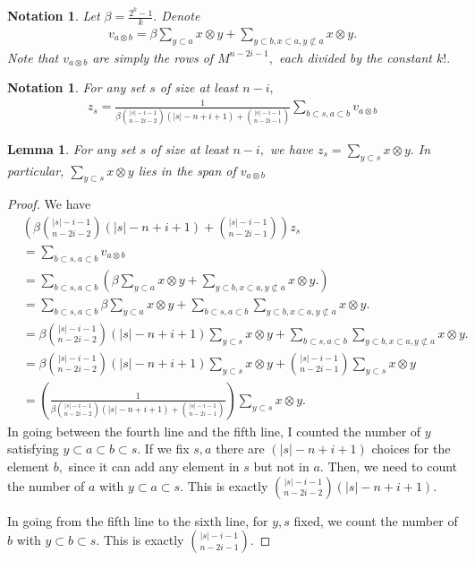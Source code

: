 \documentclass{amsart}
\newtheorem{lem}[subsubsection]{Lemma}
\newtheorem{note}[subsubsection]{Notation}
\begin{document}
\begin{note}

Let $\beta = \frac{2^k-1}{k}.$ Denote 
\begin{align*}
	v_{a \otimes b} =\beta \sum_{y \subset a}^{}x \otimes y + \sum_{y\subset b,x \subset a,y\not\subset a}^{}x\otimes y.
\end{align*}
Note that $v_{a \otimes b}$ are simply the rows of $M^{n-2i-1},$ each divided by the constant $k!.$
\end{note}

\begin{note}
For any set $s$ of size at least $n-i,$
\begin{align*}
	z_s = \frac{1}{\beta\binom {|s|-i-1}{n-2i-2}(|s|-n+i+1)+\binom{|s|-i-1}{n-2i-1}} \sum_{b\subset s,a \subset b}^{}v_{a\otimes b}
\end{align*}
\end{note}



\begin{lem}
\label{z_equivalence}
For any set $s$ of size at least $n-i,$ we have $z_s = \sum_{y \subset s}^{}x\otimes y.$ In particular, $\sum_{y \subset s}^{}x\otimes y$ lies in the span of $v_{a\otimes b}$
\end{lem}
\begin{proof}
We have 
\begin{align*}
	&\left(\beta\binom {|s|-i-1}{n-2i-2}(|s|-n+i+1)+\binom{|s|-i-1}{n-2i-1}\right) z_s \\
	&= \sum_{b\subset s,a \subset b}^{}v_{a\otimes b}\\
	&=\sum_{b\subset s,a \subset b}^{} \left(\beta \sum_{y \subset a}^{}x \otimes y + \sum_{y\subset b,x \subset a,y\not\subset a}^{}x\otimes y.\right)\\
	&= \sum_{b\subset s,a \subset b}^{} \beta \sum_{y \subset a}^{}x \otimes y + \sum_{b\subset s,a \subset b}^{} \sum_{y\subset b,x \subset a,y\not\subset a}^{}x\otimes y.\\
	&= \beta\binom {|s|-i-1}{n-2i-2}(|s|-n+i+1) \sum_{y \subset s}^{}x \otimes y+ \sum_{b\subset s,a \subset b}^{} \sum_{y\subset b,x \subset a,y\not\subset a}^{}x\otimes y.\\
	&= \beta\binom {|s|-i-1}{n-2i-2}(|s|-n+i+1) \sum_{y \subset s}^{}x \otimes y + \binom{|s|-i-1}{n-2i-1}\sum_{y\subset s}^{}x\otimes y\\
	& =\left(\frac{1}{\beta\binom {|s|-i-1}{n-2i-2}(|s|-n+i+1)+\binom{|s|-i-1}{n-2i-1}}\right) \sum_{y \subset s}^{}x\otimes y.
\end{align*}
In going between the fourth line and the fifth line, I counted the number of $y$ satisfying $y \subset a \subset b\subset s.$ If we fix $s,a$ there are $(|s|-n+i+1)$ choices for the element $b,$ since it can add any element in $s$ but not in $a.$ Then, we need to count the number of $a$ with $y \subset a \subset s.$ This is exactly $\binom {|s|-i-1}{n-2i-2}(|s|-n+i+1).$

In going from the fifth line to the sixth line, for $y,s$ fixed, we count the number of $b$ with $y \subset b \subset s.$ This is exactly $\binom{|s|-i-1}{n-2i-1}$.
\end{proof}
\end{document}
